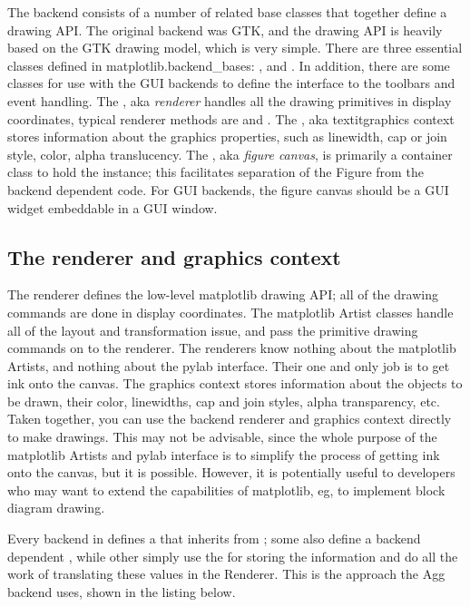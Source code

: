 \documentclass[twoside]{book}
\begin{document}
The backend consists of a number of related base classes that together
define a drawing API.  The original backend was GTK, and the drawing
API is heavily based on the GTK drawing model, which is very simple.
There are three essential classes defined in
matplotlib.backend\_bases: ,
 and .  In
addition, there are some classes for use with the GUI backends to
define the interface to the toolbars and event handling.  The
, aka \textit{renderer} handles all the drawing
primitives in display coordinates, typical renderer methods are
 and .  The
, aka textit{graphics context} stores
information about the graphics properties, such as linewidth, cap or
join style, color, alpha translucency.  The ,
aka \textit{figure canvas}, is primarily a container class to hold the
 instance; this facilitates separation of the Figure
from the backend dependent code.  For GUI backends, the figure canvas
should be a GUI widget embeddable in a GUI window.



\subsection{The renderer and graphics context}
\label{sec:renderer}

The renderer defines the low-level matplotlib drawing API; all of the
drawing commands are done in display coordinates.  The matplotlib
Artist classes handle all of the layout and transformation issue, and
pass the primitive drawing commands on to the renderer.  The renderers
know nothing about the matplotlib Artists, and nothing about the
pylab interface.  Their one and only job is to get ink onto the
canvas.  The graphics context stores information about the objects to
be drawn, their color, linewidths, cap and join styles, alpha
transparency, etc.  Taken together, you can use the backend renderer
and graphics context directly to make drawings.  This may not be
advisable, since the whole purpose of the matplotlib Artists and
pylab interface is to simplify the process of getting ink onto the
canvas, but it is possible.  However, it is potentially useful to
developers who may want to extend the capabilities of matplotlib, eg,
to implement block diagram drawing.

Every backend in  defines a
 that inherits from ; some also
define a backend dependent , while other simply
use the  for storing the information and
do all the work of translating these values in the \class Renderer.
This is the approach the Agg backend uses, shown in the listing below.
\end{document}
